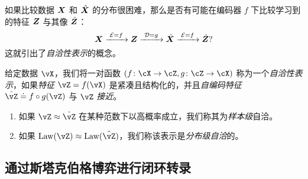 \documentclass[../../book-main_zh.tex]{subfiles}
\begin{document}
如果比较数据 $\bm{X}$ 和 $\hat {\bm{X}}$ 的分布很困难，那么是否有可能在编码器 $f$ 下比较学习到的特征 $\bm{Z}$ 与其像 $\hat {\bm{Z}}$：
\begin{equation}
 \bm{X}
\xrightarrow{\hspace{1mm} \mathcal{E} = f \hspace{1mm}} \bm{Z}  \xrightarrow{\hspace{1mm} \mathcal{D} = g \hspace{1mm}} \hat{\bm{X}} \xrightarrow{\hspace{1mm} \mathcal{E} = f \hspace{1mm}} \hat {\bm{Z}}?
\label{eqn:closed-autoencoding}
\end{equation}
这就引出了{\em 自洽性表示}的概念。
\begin{definition}[自洽性表示]\label{def:closed_loop}
    给定数据 \(\vX\)，我们将一对函数 \((f \colon \cX \to \cZ, g \colon \cZ \to \cX)\) 称为一个\textit{自洽性表示}，如果\textit{特征} \(\vZ = f(\vX)\) 是紧凑且结构化的，并且\textit{自编码特征} \(\hat{\vZ} \doteq f \circ g(\vZ)\) 与 \(\vZ\) \textit{接近}。
    \begin{enumerate}
        \item 如果 \(\vZ \approx \hat{\vZ}\) 在某种范数下以高概率成立，我们称其为\textit{样本级}自洽。
        \item 如果 \(\Law(\vZ) \approx \Law(\hat{\vZ})\)，我们称该表示是\textit{分布级自洽}的。
    \end{enumerate}
\end{definition}



\subsection{通过斯塔克伯格博弈进行闭环转录}\label{sec:closed-loop-transcription}

\end{document}
